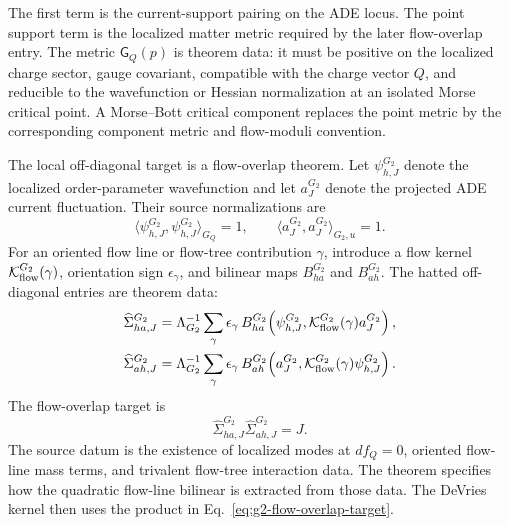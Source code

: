 The first term is the current-support pairing on the ADE locus.  The point
support term is the localized matter metric required by the later flow-overlap
entry.  The metric \(\mathsf G_Q(p)\) is theorem data: it must be positive on
the localized charge sector, gauge covariant, compatible with the charge vector
\(Q\), and reducible to the wavefunction or Hessian normalization at an isolated
Morse critical point.  A Morse--Bott critical component replaces the point
metric by the corresponding component metric and flow-moduli convention.

The local off-diagonal target is a flow-overlap theorem.  Let
\(\psi_{h,J}^{G_2}\) denote the localized order-parameter wavefunction and let
\(a_J^{G_2}\) denote the projected ADE current fluctuation.  Their source
normalizations are
\begin{equation}
  \langle\psi_{h,J}^{G_2},\psi_{h,J}^{G_2}\rangle_{G_Q}=1,
  \qquad
  \langle a_J^{G_2},a_J^{G_2}\rangle_{G_2,u}=1 .
  \label{eq:g2-flow-wavefunction-normalization}
\end{equation}
For an oriented flow line or flow-tree contribution \(\gamma\), introduce a
flow kernel \(\mathcal K_{\rm flow}^{G_2}(\gamma)\), orientation sign
\(\epsilon_\gamma\), and bilinear maps \(B_{ha}^{G_2}\) and \(B_{ah}^{G_2}\).
The hatted off-diagonal entries are theorem data:
\begin{equation}
  \begin{aligned}
  \widehat\Sigma_{ha,J}^{G_2}
  &=
  \Lambda_{G_2}^{-1}
  \sum_{\gamma}
  \epsilon_\gamma\,
  B_{ha}^{G_2}\!\left(
  \psi_{h,J}^{G_2},
  \mathcal K_{\rm flow}^{G_2}(\gamma)a_J^{G_2}
  \right),
  \\
  \widehat\Sigma_{ah,J}^{G_2}
  &=
  \Lambda_{G_2}^{-1}
  \sum_{\gamma}
  \epsilon_\gamma\,
  B_{ah}^{G_2}\!\left(
  a_J^{G_2},
  \mathcal K_{\rm flow}^{G_2}(\gamma)\psi_{h,J}^{G_2}
  \right).
  \end{aligned}
  \label{eq:g2-flow-overlap-definitions}
\end{equation}
The flow-overlap target is
\begin{equation}
  \widehat\Sigma_{ha,J}^{G_2}\widehat\Sigma_{ah,J}^{G_2}=J .
  \label{eq:g2-flow-overlap-target}
\end{equation}
The source datum is the existence of localized modes at \(df_Q=0\), oriented
flow-line mass terms, and trivalent flow-tree interaction data.  The theorem
specifies how the quadratic flow-line bilinear is extracted from those data.
The DeVries kernel then uses the product in
Eq.~\eqref{eq:g2-flow-overlap-target}.
